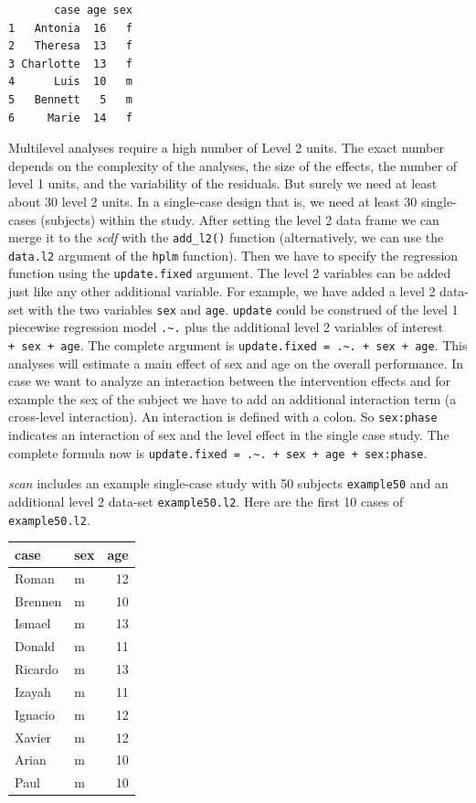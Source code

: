 \documentclass[
  letterpaper,
  DIV=11,
  numbers=noendperiod]{scrreprt}
\begin{document}
\begin{verbatim}
       case age sex
1   Antonia  16   f
2   Theresa  13   f
3 Charlotte  13   f
4      Luis  10   m
5   Bennett   5   m
6     Marie  14   f
\end{verbatim}

Multilevel analyses require a high number of Level 2 units. The exact
number depends on the complexity of the analyses, the size of the
effects, the number of level 1 units, and the variability of the
residuals. But surely we need at least about 30 level 2 units. In a
single-case design that is, we need at least 30 single-cases (subjects)
within the study. After setting the level 2 data frame we can merge it
to the \emph{scdf} with the \texttt{add\_l2()} function (alternatively,
we can use the \texttt{data.l2} argument of the \texttt{hplm} function).
Then we have to specify the regression function using the
\texttt{update.fixed} argument. The level 2 variables can be added just
like any other additional variable. For example, we have added a level 2
data-set with the two variables \texttt{sex} and \texttt{age}.
\texttt{update} could be construed of the level 1 piecewise regression
model \texttt{.\textasciitilde{}.} plus the additional level 2 variables
of interest \texttt{+\ sex\ +\ age}. The complete argument is
\texttt{update.fixed\ =\ .\textasciitilde{}.\ +\ sex\ +\ age}. This
analyses will estimate a main effect of sex and age on the overall
performance. In case we want to analyze an interaction between the
intervention effects and for example the sex of the subject we have to
add an additional interaction term (a cross-level interaction). An
interaction is defined with a colon. So \texttt{sex:phase} indicates an
interaction of sex and the level effect in the single case study. The
complete formula now is
\texttt{update.fixed\ =\ .\textasciitilde{}.\ +\ sex\ +\ age\ +\ sex:phase}.

\emph{scan} includes an example single-case study with 50 subjects
\texttt{example50} and an additional level 2 data-set
\texttt{example50.l2}. Here are the first 10 cases of
\texttt{example50.l2}.

\begin{longtable}[]{@{}llr@{}}
\toprule()
case & sex & age \\
\midrule()
\endhead
Roman & m & 12 \\
Brennen & m & 10 \\
Ismael & m & 13 \\
Donald & m & 11 \\
Ricardo & m & 13 \\
Izayah & m & 11 \\
Ignacio & m & 12 \\
Xavier & m & 12 \\
Arian & m & 10 \\
Paul & m & 10 \\
\bottomrule()
\end{longtable}
\end{document}
